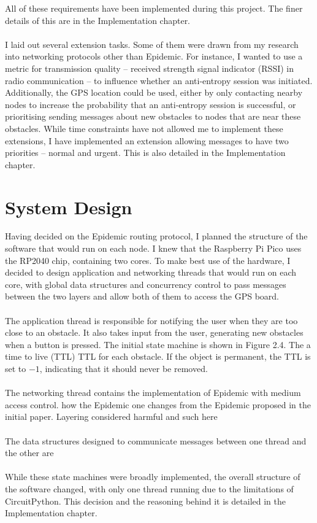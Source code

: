 \documentclass[12pt,a4paper]{report}
\begin{document}
All of these requirements have been implemented during this project. The finer details of this are in the Implementation chapter. \\ \\ I laid out several extension tasks. Some of them were drawn from my research into networking protocols other than Epidemic. For instance, I wanted to use a metric for transmission quality -- received strength signal indicator (RSSI) in radio communication -- to influence whether an anti-entropy session was initiated. Additionally, the GPS location could be used, either by only contacting nearby nodes to increase the probability that an anti-entropy session is successful, or prioritising sending messages about new obstacles to nodes that are near these obstacles. While time constraints have not allowed me to implement these extensions, I have implemented an extension allowing messages to have two priorities -- normal and urgent. This is also detailed in the Implementation chapter. 

\section{System Design}
Having decided on the Epidemic routing protocol, I planned the structure of the software that would run on each node. I knew that the Raspberry Pi Pico uses the RP2040 chip, containing two cores. To make best use of the hardware, I decided to design application and networking threads that would run on each core, with global data structures and concurrency control to pass messages between the two layers and allow both of them to access the GPS board. \\ \\
The application thread is responsible for notifying the user when they are too close to an obstacle. It also takes input from the user, generating new obstacles when a button is pressed. The initial state machine is shown in Figure 2.4. The a time to live (TTL) TTL for each obstacle. If the object is permanent, the TTL is set to $-1$, indicating that it should never be removed. \\ \\
The networking thread contains the implementation of Epidemic with medium access control. how the Epidemic one changes from the Epidemic proposed in the initial paper. Layering considered harmful and such here\\ \\
The data structures designed to communicate messages between one thread and the other are  \\ \\
While these state machines were broadly implemented, the overall structure of the software changed, with only one thread running due to the limitations of CircuitPython. This decision and the reasoning behind it is detailed in the Implementation chapter. 
\end{document}
